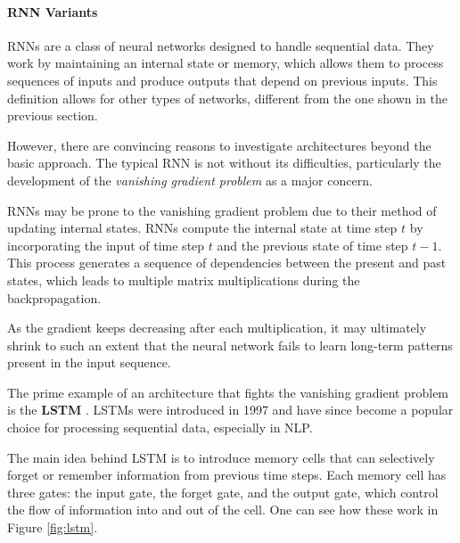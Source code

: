 \paragraph{RNN Variants} \label{sec:rnn-variants}

\Acp{RNN} are a class of neural networks designed to handle sequential data. They work by maintaining an internal state or memory, which allows them to process sequences of inputs and produce outputs that depend on previous inputs. This definition allows for other types of networks, different from the one shown in the previous section.

However, there are convincing reasons to investigate architectures beyond the basic approach. The typical \ac{RNN} is not without its difficulties, particularly the development of the \textit{vanishing gradient problem} as a major concern.

\Acp{RNN} may be prone to the vanishing gradient problem due to their method of updating internal states. \Acp{RNN} compute the internal state at time step $t$ by incorporating the input of time step $t$ and the previous state of time step $t-1$. This process generates a sequence of dependencies between the present and past states, which leads to multiple matrix multiplications during the backpropagation.

As the gradient keeps decreasing after each multiplication, it may ultimately shrink to such an extent that the neural network fails to learn long-term patterns present in the input sequence.

The prime example of an architecture that fights the vanishing gradient problem is the \textbf{\acf{LSTM}} \cite{hochreiter_long_1997}. \Acp{LSTM} were introduced in 1997 and have since become a popular choice for processing sequential data, especially in \ac{NLP}.

The main idea behind \ac{LSTM} is to introduce memory cells that can selectively forget or remember information from previous time steps. Each memory cell has three gates: the input gate, the forget gate, and the output gate, which control the flow of information into and out of the cell. One can see how these work in Figure \ref{fig:lstm}.

